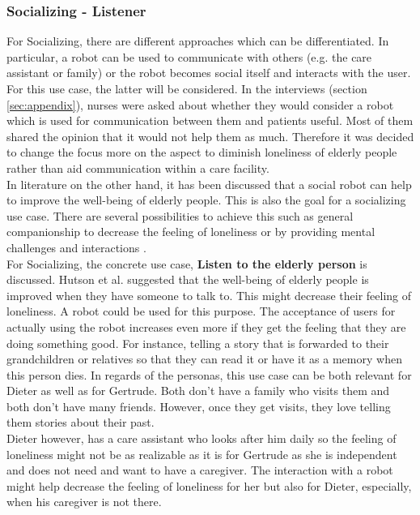 \documentclass[plainarticle,zihtitle,english,final,hyperref,utf8]{zihpub}
\begin{document}
\subsubsection{Socializing - Listener}
\label{sec:socializing}
For Socializing, there are different approaches which can be differentiated. In particular, a robot can be used to communicate with others (e.g. the care assistant or family) or the robot becomes social itself and interacts with the user. For this use case, the latter will be considered. In the interviews (section \ref{sec:appendix}), nurses were asked about whether they would consider a robot which is used for communication between them and patients useful. Most of them shared the opinion that it would not help them as much. Therefore it was decided to change the focus more on the aspect to diminish loneliness of elderly people rather than aid communication within a care facility.\\
\newline
In literature on the other hand, it has been discussed that a social robot can help to improve the well-being of elderly people. This is also the goal for a socializing use case. There are several possibilities to achieve this such as  general companionship to decrease the feeling of loneliness or by providing mental challenges and interactions .\\
\newline
For Socializing, the concrete use case, \textbf{Listen to the elderly person} is discussed. 
Hutson et al. \cite{hutson11} suggested that the well-being of elderly people is improved when they have someone to talk to. This might decrease their feeling of loneliness. A robot could be used for this purpose. The acceptance of users for actually using the robot increases even more if they get the feeling that they are doing something good. For instance, telling a story that is forwarded to their grandchildren or relatives so that they can read it or have it as a memory when this person dies.
\newline
In regards of the personas, this use case can be both relevant for Dieter as well as for Gertrude. Both don't have a family who visits them and both don't have many friends. However, once they get visits, they love telling them stories about their past.\\
Dieter however, has a care assistant who looks after him daily so the feeling of loneliness might not be as realizable as it is for Gertrude as she is independent and does not need and want to have a caregiver. The interaction with a robot might help decrease the feeling of loneliness for her but also for Dieter, especially, when his caregiver is not there.\\
\end{document}
